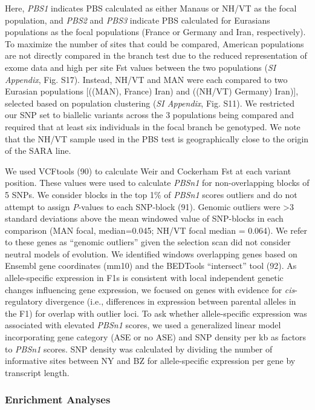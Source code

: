 \documentclass[9pt,twocolumn,twoside,lineno]{pnas-new}
\begin{document}
Here, \emph{PBS1} indicates PBS calculated as either Manaus or NH/VT as
the focal population, and \emph{PBS2} and \emph{PBS3} indicate PBS
calculated for Eurasians populations as the focal populations (France or
Germany and Iran, respectively). To maximize the number of sites that
could be compared, American populations are not directly compared in the
branch test due to the reduced representation of exome data and high per
site Fst values between the two populations (\emph{SI Appendix}, Fig.
S17). Instead, NH/VT and MAN were each compared to two Eurasian
populations {[}((MAN), France) Iran) and ((NH/VT) Germany) Iran){]},
selected based on population clustering (\emph{SI Appendix}, Fig. S11).
We restricted our SNP set to biallelic variants across the 3 populations
being compared and required that at least six individuals in the focal
branch be genotyped. We note that the NH/VT sample used in the PBS test
is geographically close to the origin of the SARA line.

We used VCFtools (90) to calculate Weir and Cockerham Fst at each
variant position. These values were used to calculate \emph{PBSn1} for
non-overlapping blocks of 5 SNPs. We consider blocks in the top 1\% of
\emph{PBSn1} scores outliers and do not attempt to assign
\emph{P}-values to each SNP-block (91). Genomic outliers were
\textgreater3 standard deviations above the mean windowed value of
SNP-blocks in each comparison (MAN focal, median=0.045; NH/VT focal
median = 0.064). We refer to these genes as ``genomic outliers'' given
the selection scan did not consider neutral models of evolution. We
identified windows overlapping genes based on Ensembl gene coordinates
(mm10) and the BEDTools ``intersect'' tool (92). As allele-specific
expression in F1s is consistent with local independent genetic changes
influencing gene expression, we focused on genes with evidence for
\emph{cis}-regulatory divergence (i.e., differences in expression
between parental alleles in the F1) for overlap with outlier loci. To
ask whether allele-specific expression was associated with elevated
\emph{PBSn1} scores, we used a generalized linear model incorporating
gene category (ASE or no ASE) and SNP density per kb as factors to
\emph{PBSn1} scores. SNP density was calculated by dividing the number
of informative sites between NY and BZ for allele-specific expression
per gene by transcript length.

\hypertarget{enrichment-analyses}{%
\subsubsection*{Enrichment Analyses}\label{enrichment-analyses}}
\end{document}
